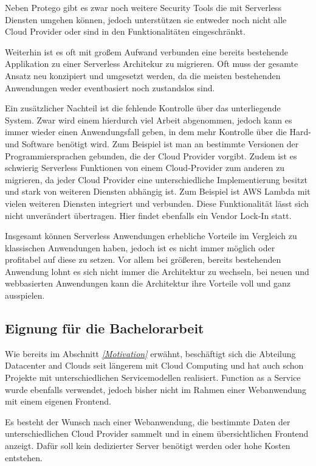 Neben Protego gibt es zwar noch weitere Security Tools die mit Serverless Diensten umgehen können, jedoch unterstützen sie entweder noch nicht alle Cloud Provider oder sind in den Funktionalitäten eingeschränkt. \cite{Security}

Weiterhin ist es oft mit großem Aufwand verbunden eine bereits bestehende Applikation zu einer Serverless Architekur zu migrieren.
Oft muss der gesamte Ansatz neu konzipiert und umgesetzt werden, da die meisten bestehenden Anwendungen weder eventbasiert noch zustandslos sind.

Ein zusätzlicher Nachteil ist die fehlende Kontrolle über das unterliegende System.
Zwar wird einem hierdurch viel Arbeit abgenommen, jedoch kann es immer wieder einen Anwendungsfall geben, in dem mehr Kontrolle über die Hard- und Software benötigt wird.
Zum Beispiel ist man an bestimmte Versionen der Programmiersprachen gebunden, die der Cloud Provider vorgibt.
Zudem ist es schwierig Serverless Funktionen von einem Cloud-Provider zum anderen zu migrieren, da jeder Cloud Provider eine unterschiedliche Implementierung besitzt und stark von weiteren Diensten abhängig ist.
Zum Beispiel ist AWS Lambda mit vielen weiteren Diensten integriert und verbunden.
Diese Funktionalität lässt sich nicht unverändert übertragen.
Hier findet ebenfalls ein Vendor Lock-In statt.


Insgesamt können Serverless Anwendungen erhebliche Vorteile im Vergleich zu klassischen Anwendungen haben, jedoch ist es nicht immer möglich oder profitabel auf diese zu setzen.
Vor allem bei größeren, bereits bestehenden Anwendung lohnt es sich nicht immer die Architektur zu wechseln, bei neuen und webbasierten Anwendungen kann die Architektur ihre Vorteile voll und ganz ausspielen.

\subsection{Eignung für die Bachelorarbeit}
Wie bereits im Abschnitt \textit{\ref{Motivation} } erwähnt, beschäftigt sich die Abteilung Datacenter and Clouds seit längerem mit Cloud Computing und hat auch schon Projekte mit unterschiedlichen Servicemodellen realisiert.
Function as a Service wurde ebenfalls verwendet, jedoch bisher nicht im Rahmen einer Webanwendung mit einem eigenen Frontend.

Es besteht der Wunsch nach einer Webanwendung, die bestimmte Daten der unterschiedlichen Cloud Provider sammelt und in einem übersichtlichen Frontend anzeigt.
Dafür soll kein dedizierter Server benötigt werden oder hohe Kosten entstehen.

